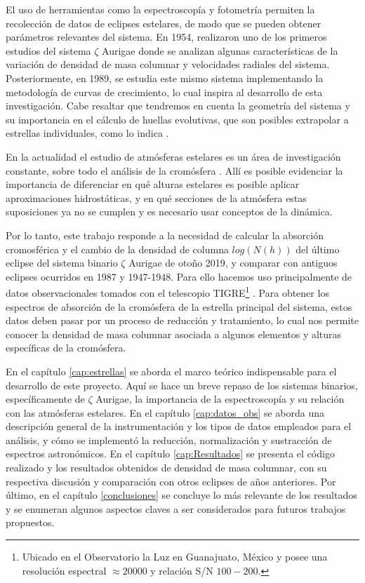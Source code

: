 \documentclass[12pt,oneside,openany,letter]{book}
\begin{document}
El uso de herramientas como la espectroscopía y fotometría permiten la recolección de datos de eclipses estelares, de modo que se pueden obtener parámetros relevantes del sistema. En 1954, \citet{wilson1954chromospheric} realizaron uno de los primeros estudios del sistema $\zeta$ Aurigae donde se analizan algunas características de la variación de densidad de masa columnar y velocidades radiales del sistema. Posteriormente, en 1989, \citet{kps1O} se estudia este mismo sistema implementando la metodología de curvas de crecimiento, lo cual inspira al desarrollo de esta investigación. Cabe resaltar que tendremos en cuenta la geometría del sistema \citep{kps9} y su importancia en el cálculo de huellas evolutivas, que son posibles extrapolar a estrellas individuales, como lo indica \citep{schroder1997critical}.

En la actualidad el estudio de atmósferas estelares es un área de investigación constante, sobre todo el análisis de la cromósfera \citep{ayres2019stellar}. Allí es posible evidenciar la importancia de diferenciar en qué alturas estelares es posible aplicar aproximaciones hidrostáticas, y en qué secciones de la atmósfera estas suposiciones ya no se cumplen y es necesario usar conceptos de la dinámica.


Por lo tanto, este trabajo responde a la necesidad de calcular la absorción cromosférica y el cambio de la densidad de columna $log(N(h))$ del último eclipse del sistema binario $\zeta$ Aurigae de otoño 2019, y comparar con antiguos eclipses ocurridos en 1987 y 1947-1948. Para ello hacemos uso principalmente de datos observacionales tomados con el telescopio TIGRE\footnote{Ubicado en el Observatorio la Luz en Guanajuato, México y posee una resolución espectral $\approx 20000$ y relación S/N $100-200$.} \citep{schmitt2014tigre}.  Para obtener los espectros de absorción de la cromósfera de la estrella principal del sistema, estos datos deben pasar por un proceso de reducción y tratamiento, lo cual nos permite conocer la densidad de masa columnar asociada a algunos elementos y alturas específicas de la cromósfera. 


En el capítulo \ref{cap:estrellas} se aborda el marco teórico indispensable para el desarrollo de este proyecto. Aquí se hace un breve repaso de los sistemas binarios, específicamente de $\zeta$ Aurigae, la importancia de la espectroscopía y su relación con las atmósferas estelares. En el capítulo \ref{cap:datos_obs} se aborda una descripción general de la instrumentación y los tipos de datos empleados para el análisis, y cómo se implementó la reducción, normalización y sustracción de espectros astronómicos. En el capítulo \ref{cap:Resultados} se presenta el código realizado y los resultados obtenidos de densidad de masa columnar, con su respectiva discusión y comparación con otros eclipses de años anteriores. Por último, en el capítulo \ref{conclusiones} se concluye lo más relevante de los resultados y se enumeran algunos aspectos claves a ser considerados para futuros trabajos propuestos.
\end{document}
